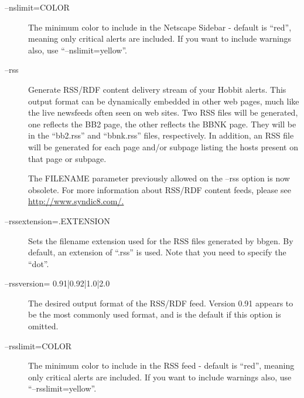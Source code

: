 \begin{description}
 

\item[--nslimit=COLOR] The minimum color to include in the Netscape
  Sidebar - default is ``red'', meaning only critical alerts are
  included. If you want to include warnings also, use
  ``--nslimit=yellow''. 


 

\item[--rss] Generate RSS/RDF content delivery stream of your Hobbit
  alerts. This output format can be dynamically embedded in other web
  pages, much like the live newsfeeds often seen on web sites. Two RSS
  files will be generated, one reflects the BB2 page, the other
  reflects the BBNK page. They will be in the ``bb2.rss'' and
  ``bbnk.rss'' files, respectively. In addition, an RSS file will be
  generated for each page and/or subpage listing the hosts present on
  that page or subpage.  

 The FILENAME parameter previously allowed on the --rss option is now obsolete.  
 For more information about RSS/RDF content feeds, please see \url{http://www.syndic8.com/.}

 

\item[--rssextension=.EXTENSION] Sets the filename extension used for
  the RSS files generated by bbgen. By default, an extension of
  ``.rss'' is used. Note that you need to specify the ``dot''. 


 

\item[--rssversion= {0.91|0.92|1.0|2.0}] The desired output format of
  the RSS/RDF feed. Version 0.91 appears to be the most commonly used
  format, and is the default if this option is omitted. 


 

\item[--rsslimit=COLOR] The minimum color to include in the RSS feed -
  default is ``red'', meaning only critical alerts are included. If
  you want to include warnings also, use ``--rsslimit=yellow''. 

\end{description}

